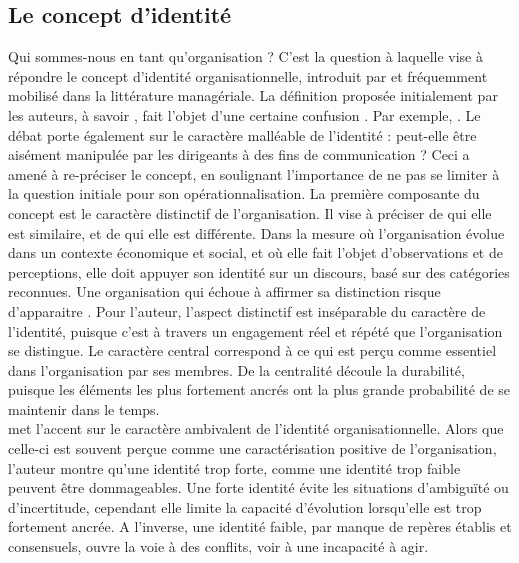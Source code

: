     \subsection{Le concept d'identité}
        Qui sommes-nous en tant qu'organisation ? C'est la question à laquelle vise à répondre le concept d'identité organisationnelle, introduit par \textcite{albert1985organizational} et fréquemment mobilisé dans la littérature managériale. La définition proposée initialement par les auteurs, à savoir , fait l'objet d'une certaine confusion \parencite{chedotel2004ambivalence}. Par exemple,  \parencite{whetten2006albert}. Le débat porte également sur le caractère malléable de l'identité : peut-elle être aisément manipulée par les dirigeants à des fins de communication ? Ceci a amené \textcite{whetten2006albert} à re-préciser le concept, en soulignant l'importance de ne pas se limiter à la question initiale pour son opérationnalisation. La première composante du concept est le caractère distinctif de l'organisation. Il vise à préciser de qui elle est similaire, et de qui elle est différente. Dans la mesure où l'organisation évolue dans un contexte économique et social, et où elle fait l'objet d'observations et de perceptions, elle doit appuyer son identité sur un discours, basé sur des catégories reconnues. Une organisation qui échoue à affirmer sa distinction risque d'apparaitre  \parencite{whetten2006albert}. Pour l'auteur, l'aspect distinctif est inséparable du caractère  de l'identité, puisque c'est à travers un engagement réel et répété que l'organisation se distingue. Le caractère central correspond à ce qui est perçu comme essentiel dans l'organisation par ses membres. De la centralité découle la durabilité, puisque les éléments les plus fortement ancrés ont la plus grande probabilité de se maintenir dans le temps. \\


       \textcite{chedotel2004ambivalence} met l'accent sur le caractère ambivalent de l'identité organisationnelle. Alors que celle-ci est souvent perçue comme une caractérisation positive de l'organisation, l'auteur montre qu'une identité trop forte, comme une identité trop faible peuvent être dommageables. Une forte identité évite les situations d'ambiguïté ou d'incertitude, cependant elle limite la capacité d'évolution lorsqu'elle est trop fortement ancrée. A l'inverse, une identité faible, par manque de repères établis et consensuels, ouvre la voie à des conflits, voir à une incapacité à agir. \\

